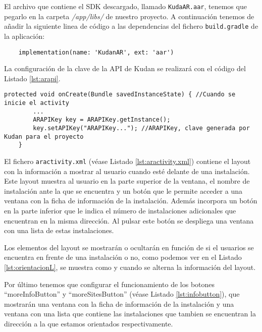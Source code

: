 El archivo que contiene el SDK descargado, llamado \texttt{KudaAR.aar}, tenemos que pegarlo en la carpeta \textit{/app/libs/} de nuestro proyecto. A continuación tenemos de añadir la siguiente linea de código a las dependencias del fichero \texttt{build.gradle} de la aplicación:

\begin{lstlisting}
    implementation(name: 'KudanAR', ext: 'aar')
\end{lstlisting}

La configuración de la clave de la API de Kudan se realizará con el código del Listado \ref{lst:arapi}.

\begin{lstlisting}[caption={Fichero \texttt{ARNavigation.java}, código para configurar la API de Kudan.},  label={lst:arapi}]
    protected void onCreate(Bundle savedInstanceState) { //Cuando se inicie el activity
        ...
        ARAPIKey key = ARAPIKey.getInstance(); 
        key.setAPIKey("ARAPIKey..."); //ARAPIKey, clave generada por Kudan para el proyecto
    }
\end{lstlisting}
 
El fichero \texttt{aractivity.xml} (véase Listado \ref{lst:aractivity.xml}) contiene el layout con la información a mostrar al usuario cuando esté delante de una instalación. Este layout muestra al usuario en la parte superior de la ventana, el nombre de instalación ante la que se encuentra y un botón que le permite acceder a una ventana con la ficha de información de la instalación. Además incorpora un botón en la parte inferior que le indica el número de instalaciones adicionales que encuentran en la misma dirección. Al pulsar este botón se despliega una ventana con una lista de estas instalaciones.



Los elementos del layout se mostrarán o ocultarán en función de si el usuarios se  encuentra en frente de una instalación o no, como podemos ver en el Listado \ref{lst:orientacionL}, se muestra como y cuando se alterna la información del layout.

Por último tenemos que configurar el funcionamiento de los botones ``moreInfoButton'' y ``moreSitesButton'' (véase Listado \ref{lst:infobutton}), que mostrarán una ventana con la ficha de información de la instalación y una ventana con una lista que contiene las instalaciones que tambien se encuentran la dirección a la que estamos orientados respectivamente. 

